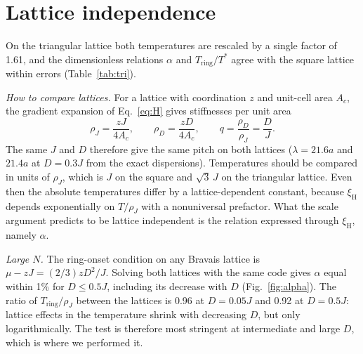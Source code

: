\documentclass[prb,reprint,longbibliography,superscriptaddress,amsmath,amssymb]{revtex4-2}
\newcommand{\Ts}{T^{*}}
\newcommand{\Tr}{T_{\mathrm{ring}}}
\newcommand{\xiH}{\xi_{\mathrm{H}}}
\begin{document}
\section{Lattice independence}
\label{sec:lattice}

On the triangular lattice both temperatures are rescaled by a single factor of 1.61, and the dimensionless relations $\alpha$ and $\Tr/\Ts$ agree with the square lattice within errors (Table~\ref{tab:tri}).

\textit{How to compare lattices.} For a lattice with coordination $z$ and unit-cell area $A_c$, the gradient expansion of Eq.~\eqref{eq:H} gives stiffnesses per unit area
\begin{equation}
\rho_J=\frac{zJ}{4A_c},\qquad \rho_D=\frac{zD}{4A_c},\qquad q=\frac{\rho_D}{\rho_J}=\frac{D}{J}.
\label{eq:rho}
\end{equation}
The same $J$ and $D$ therefore give the same pitch on both lattices ($\lambda=21.6a$ and $21.4a$ at $D=0.3J$ from the exact dispersions). Temperatures should be compared in units of $\rho_J$, which is $J$ on the square and $\sqrt3\,J$ on the triangular lattice. Even then the absolute temperatures differ by a lattice-dependent constant, because $\xiH$ depends exponentially on $T/\rho_J$ with a nonuniversal prefactor. What the scale argument predicts to be lattice independent is the relation expressed through $\xiH$, namely $\alpha$.

\textit{Large $N$.} The ring-onset condition on any Bravais lattice is $\mu-zJ=(2/3)zD^2/J$. Solving both lattices with the same code gives $\alpha$ equal within 1\% for $D\le0.5J$, including its decrease with $D$ (Fig.~\ref{fig:alpha}). The ratio of $\Tr/\rho_J$ between the lattices is 0.96 at $D=0.05J$ and 0.92 at $D=0.5J$: lattice effects in the temperature shrink with decreasing $D$, but only logarithmically. The test is therefore most stringent at intermediate and large $D$, which is where we performed it.
\end{document}
